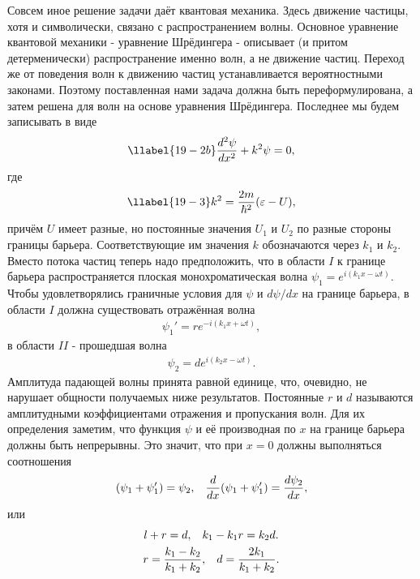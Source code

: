 Совсем иное решение задачи даёт квантовая механика. Здесь движение частицы, хотя и символически, связано с распространением волны. Основное уравнение квантовой механики - уравнение Шрёдингера - описывает (и притом детерменически) распространение именно волн, а не движение частиц. Переход же от поведения волн к движению частиц устанавливается вероятностными законами. Поэтому поставленная нами задача должна быть переформулирована, а затем решена для волн на основе уравнения Шрёдингера. Последнее мы будем записывать в виде
\begin{gather}
\llabel{19-2b}
\frac{d^2\psi}{dx^2} + k^2\psi = 0,
\end{gather}
где
\begin{gather}
\llabel{19-3}
k^2 = \frac{2m}{\hbar^2}(\mathcal{\varepsilon} - U),
\end{gather}
причём $U$ имеет разные, но постоянные значения $U_1$ и $U_2$ по разные стороны границы барьера. Соответствующие им значения $k$ обозначаются через $k_1$ и $k_2$.\\
Вместо потока частиц теперь надо предположить, что в области $I$ к границе барьера распространяется плоская монохроматическая волна $\psi_1 = e^{i(k_1x-\omega t)}$.\\
Чтобы удовлетворялись граничные условия для $\psi$ и $d\psi/dx$ на границе барьера, в области $I$ должна существовать отражённая волна
\begin{gather*}
	\psi_1' = re^{-i(k_1x+\omega t)},
\end{gather*}
в области $II$ - прошедшая волна
\begin{gather*}
\psi_2 = de^{i(k_2x - \omega t)}.
\end{gather*}
Амплитуда падающей волны принята равной единице, что, очевидно, не нарушает общности получаемых ниже результатов. Постоянные $r$ и $d$ называются амплитудными коэффициентами отражения и пропускания волн. Для их определения заметим, что функция $\psi$ и её производная по $x$ на границе барьера должны быть непрерывны. Это значит, что при $x = 0$ должны выполняться соотношения
\begin{gather*}
(\psi_1 + \psi_1') = \psi_2, \hspace{3mm} \frac{d}{dx}(\psi_1 + \psi_1') = \frac{d\psi_2}{dx},
\end{gather*}
или
\begin{gather*}
l + r = d, \hspace{3mm} k_1 - k_1r = k_2d.\\
r = \frac{k_1-k_2}{k_1 + k_2}, \hspace{3mm} d = \frac{2k_1}{k_1 + k_2}.
\end{gather*}

